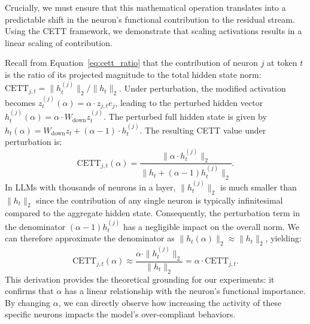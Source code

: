 \documentclass[dvipsnames]{article}
\begin{document}
Crucially, we must ensure that this mathematical operation translates into a predictable shift in the neuron's functional contribution to the residual stream. Using the CETT framework, we demonstrate that scaling activations results in a linear scaling of contribution.

Recall from Equation~\ref{eq:cett_ratio} that the contribution of neuron $j$ at token $t$ is the ratio of its projected magnitude to the total hidden state norm: $\mathrm{CETT}_{j,t} = \|h_t^{(j)}\|_2 / \|h_t\|_2$. Under perturbation, the modified activation becomes $z_t^{(j)}(\alpha) = \alpha \cdot z_{j,t} e_j$, leading to the perturbed hidden vector $h_t^{(j)}(\alpha) = \alpha \cdot W_{\text{down}} z_t^{(j)}$. The perturbed full hidden state is given by $h_t(\alpha) = W_{\text{down}} z_t + (\alpha - 1) \cdot h_t^{(j)}$. The resulting CETT value under perturbation is:
\begin{equation}
\mathrm{CETT}_{j,t}(\alpha) = \frac{\|\alpha \cdot h_t^{(j)}\|_2}{\|h_t + (\alpha - 1) h_t^{(j)}\|_2}.
\end{equation}
In LLMs with thousands of neurons in a layer, $\|h_t^{(j)}\|_2$ is much smaller than $\|h_t\|_2$ since the contribution of any single neuron is typically infinitesimal compared to the aggregate hidden state. Consequently, the perturbation term in the denominator $(\alpha - 1)h_t^{(j)}$ has a negligible impact on the overall norm. We can therefore approximate the denominator as $\|h_t(\alpha)\|_2 \approx \|h_t\|_2$, yielding:
\begin{equation}
\mathrm{CETT}_{j,t}(\alpha) \approx \frac{\alpha \cdot \|h_t^{(j)}\|_2}{\|h_t\|_2} = \alpha \cdot \mathrm{CETT}_{j,t}.
\end{equation}
This derivation provides the theoretical grounding for our experiments: it confirms that $\alpha$ has a linear relationship with the neuron's functional importance. By changing $\alpha$, we can directly observe how increasing the activity of these specific neurons impacts the model's over-compliant behaviors.



\end{document}

